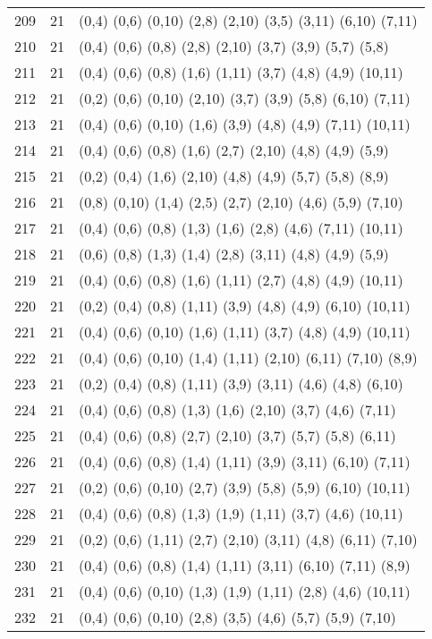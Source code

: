{\begin{longtable}{lll}
209 & 21 & (0,4) (0,6) (0,10) (2,8) (2,10) (3,5) (3,11) (6,10) (7,11) \\
210 & 21 & (0,4) (0,6) (0,8) (2,8) (2,10) (3,7) (3,9) (5,7) (5,8) \\
211 & 21 & (0,4) (0,6) (0,8) (1,6) (1,11) (3,7) (4,8) (4,9) (10,11) \\
212 & 21 & (0,2) (0,6) (0,10) (2,10) (3,7) (3,9) (5,8) (6,10) (7,11) \\
213 & 21 & (0,4) (0,6) (0,10) (1,6) (3,9) (4,8) (4,9) (7,11) (10,11) \\
214 & 21 & (0,4) (0,6) (0,8) (1,6) (2,7) (2,10) (4,8) (4,9) (5,9) \\
215 & 21 & (0,2) (0,4) (1,6) (2,10) (4,8) (4,9) (5,7) (5,8) (8,9) \\
216 & 21 & (0,8) (0,10) (1,4) (2,5) (2,7) (2,10) (4,6) (5,9) (7,10) \\
217 & 21 & (0,4) (0,6) (0,8) (1,3) (1,6) (2,8) (4,6) (7,11) (10,11) \\
218 & 21 & (0,6) (0,8) (1,3) (1,4) (2,8) (3,11) (4,8) (4,9) (5,9) \\
219 & 21 & (0,4) (0,6) (0,8) (1,6) (1,11) (2,7) (4,8) (4,9) (10,11) \\
220 & 21 & (0,2) (0,4) (0,8) (1,11) (3,9) (4,8) (4,9) (6,10) (10,11) \\
221 & 21 & (0,4) (0,6) (0,10) (1,6) (1,11) (3,7) (4,8) (4,9) (10,11) \\
222 & 21 & (0,4) (0,6) (0,10) (1,4) (1,11) (2,10) (6,11) (7,10) (8,9) \\
223 & 21 & (0,2) (0,4) (0,8) (1,11) (3,9) (3,11) (4,6) (4,8) (6,10) \\
224 & 21 & (0,4) (0,6) (0,8) (1,3) (1,6) (2,10) (3,7) (4,6) (7,11) \\
225 & 21 & (0,4) (0,6) (0,8) (2,7) (2,10) (3,7) (5,7) (5,8) (6,11) \\
226 & 21 & (0,4) (0,6) (0,8) (1,4) (1,11) (3,9) (3,11) (6,10) (7,11) \\
227 & 21 & (0,2) (0,6) (0,10) (2,7) (3,9) (5,8) (5,9) (6,10) (10,11) \\
228 & 21 & (0,4) (0,6) (0,8) (1,3) (1,9) (1,11) (3,7) (4,6) (10,11) \\
229 & 21 & (0,2) (0,6) (1,11) (2,7) (2,10) (3,11) (4,8) (6,11) (7,10) \\
230 & 21 & (0,4) (0,6) (0,8) (1,4) (1,11) (3,11) (6,10) (7,11) (8,9) \\
231 & 21 & (0,4) (0,6) (0,10) (1,3) (1,9) (1,11) (2,8) (4,6) (10,11) \\
232 & 21 & (0,4) (0,6) (0,10) (2,8) (3,5) (4,6) (5,7) (5,9) (7,10) \\

\end{longtable}}
